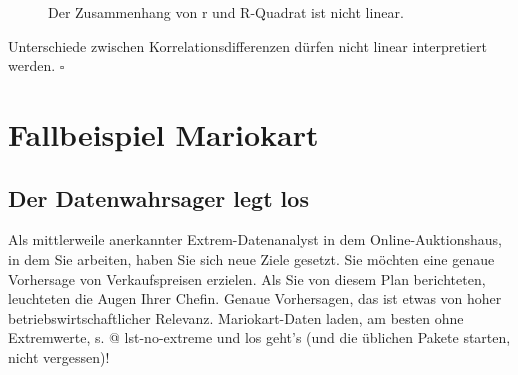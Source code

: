 \documentclass[
  letterpaper,
  oneside,
  open=any]{scrbook}
\theoremstyle{definition}
\theoremstyle{definition}
\theoremstyle{definition}
\theoremstyle{remark}
\begin{document}
\begin{figure}


\caption{\label{fig-r-r2}Der Zusammenhang von r und R-Quadrat ist nicht
linear.}

\end{figure}%

\begin{tcolorbox}[enhanced jigsaw, bottomrule=.15mm, left=2mm, colbacktitle=quarto-callout-caution-color!10!white, bottomtitle=1mm, colframe=quarto-callout-caution-color-frame, coltitle=black, rightrule=.15mm, breakable, toptitle=1mm, titlerule=0mm, title=\textcolor{quarto-callout-caution-color}{\faFire}\hspace{0.5em}{Vorsicht}, opacitybacktitle=0.6, arc=.35mm, colback=white, leftrule=.75mm, opacityback=0, toprule=.15mm]

Unterschiede zwischen Korrelationsdifferenzen dürfen nicht linear
interpretiert werden. \(\square\)

\end{tcolorbox}

\section{Fallbeispiel Mariokart}\label{fallbeispiel-mariokart}

\subsection{Der Datenwahrsager legt
los}\label{der-datenwahrsager-legt-los}

Als mittlerweile anerkannter Extrem-Datenanalyst in dem
Online-Auktionshaus, in dem Sie arbeiten, haben Sie sich neue Ziele
gesetzt. Sie möchten eine genaue Vorhersage von Verkaufspreisen
erzielen. Als Sie von diesem Plan berichteten, leuchteten die Augen
Ihrer Chefin. Genaue Vorhersagen, das ist etwas von hoher
betriebswirtschaftlicher Relevanz. Mariokart-Daten laden, am besten ohne
Extremwerte, s. @ lst-no-extreme und los geht's (und die üblichen Pakete
starten, nicht vergessen)!
\end{document}
